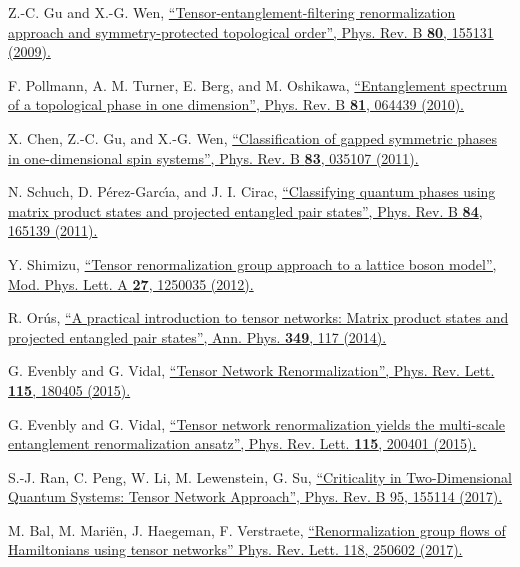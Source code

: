 \documentclass[a4paper,preprintnumbers,nofootinbib,twocolumn]{quantumarticle}
\begin{document}
\begin{thebibliography}{99}
Z.-C. Gu and X.-G. Wen,
\href{https://doi.org/10.1103/PhysRevB.80.155131}{
``Tensor-entanglement-filtering renormalization approach and symmetry-protected topological order'',
Phys. Rev. B {\bf 80}, 155131 (2009).
}

  F. Pollmann, A. M. Turner, E.  Berg, and M.  Oshikawa,
\href{https://doi.org/10.1103/PhysRevB.81.064439}{
``Entanglement spectrum of a topological phase in one dimension'',
Phys. Rev. B {\bf 81}, 064439 (2010).
}

  X.  Chen, Z.-C. Gu, and X.-G. Wen,
\href{https://doi.org/10.1103/PhysRevB.83.035107}{
``Classification of gapped symmetric phases in one-dimensional spin systems'',
Phys. Rev. B {\bf 83}, 035107 (2011).
}

  N. Schuch, D.  P\'erez-Garc\'{\i}a, and J. I. Cirac,
\href{https://doi.org/10.1103/PhysRevB.84.165139}{
``Classifying quantum phases using matrix product states and projected entangled pair states'',
Phys. Rev. B {\bf 84}, 165139 (2011).
}

 Y. Shimizu,
\href{https://doi.org/10.1142/S0217732312500356}{
``Tensor renormalization group approach  to a lattice boson model'',
Mod.  Phys.  Lett.  A {\bf 27},   1250035  (2012).
}

 R. Or\'us,
\href{https://doi.org/10.1016/j.aop.2014.06.013}{
``A practical introduction to tensor networks: Matrix product states and projected entangled pair states'',
Ann. Phys. {\bf 349}, 117 (2014).
}

G.  Evenbly and G.  Vidal,
\href{https://doi.org/10.1103/PhysRevLett.115.180405}{
``Tensor Network Renormalization'',
Phys. Rev. Lett. {\bf 115}, 180405 (2015). 
}

G.  Evenbly and G.  Vidal,
\href{https://doi.org/10.1103/PhysRevLett.115.200401}{
``Tensor network renormalization yields the multi-scale entanglement renormalization ansatz'',
Phys. Rev. Lett. {\bf 115}, 200401 (2015).
}

 S.-J. Ran, C. Peng, W. Li, M. Lewenstein, G. Su,
\href{https://doi.org/10.1103/PhysRevB.95.155114}{
``Criticality in Two-Dimensional Quantum Systems: Tensor Network Approach'',
 Phys. Rev. B 95, 155114 (2017).
}

 M. Bal, M. Mari\"en, J. Haegeman, F. Verstraete,
\href{https://doi.org/10.1103/PhysRevLett.118.250602}{
``Renormalization group flows of Hamiltonians using tensor networks''
Phys. Rev. Lett. 118, 250602 (2017).
}


\end{thebibliography}
\end{document}
